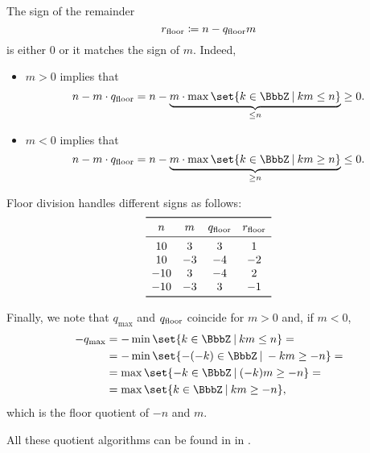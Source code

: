 \begin{remark}
\begin{thmenum}
    The sign of the remainder
    \begin{equation*}
      r_{\operatorname{floor}} \coloneqq n - q_{\operatorname{floor}} m
    \end{equation*}
    is either \( 0 \) or it matches the sign of \( m \). Indeed,
    \begin{itemize}
      \item \( m > 0 \) implies that
      \begin{equation*}
        n - m \cdot q_{\floor}
        =
        n - \underbrace{m \cdot \max\set{ k \in \BbbZ \given km \leq n }}_{\leq n}
        \geq
        0.
      \end{equation*}

      \item \( m < 0 \) implies that
      \begin{equation*}
        n - m \cdot q_{\floor}
        =
        n - \underbrace{m \cdot \max\set{ k \in \BbbZ \given km \geq n }}_{\geq n}
        \leq
        0.
      \end{equation*}
    \end{itemize}

    Floor division handles different signs as follows:
    \begin{equation*}
      \begin{array}{*{4}{c}}
        \toprule
        n   & m  & q_{\floor} & r_{\floor} \\
        \midrule
        10  & 3  & 3          & 1          \\
        10  & -3 & -4         & -2         \\
        -10 & 3  & -4         & 2          \\
        -10 & -3 & 3          & -1         \\
        \bottomrule
      \end{array}
    \end{equation*}

    Finally, we note that \( q_{\max} \) and \( q_{\operatorname{floor}} \) coincide for \( m > 0 \) and, if \( m < 0 \),
    \begin{align*}
      -q_{\max}
      &=
      -\min\set{ k \in \BbbZ \given km \leq n }
      = \\ &=
      -\min\set{ -(-k) \in \BbbZ \given -km \geq -n }
      = \\ &=
      \max\set{ -k \in \BbbZ \given (-k)m \geq -n }
      = \\ &=
      \max\set{ k \in \BbbZ \given km \geq -n },
    \end{align*}
    which is the floor quotient of \( -n \) and \( m \).
  \end{thmenum}
\end{remark}
\begin{comments}
  \item All these quotient algorithms can be found in  in \cite{notebook:code}.
\end{comments}

